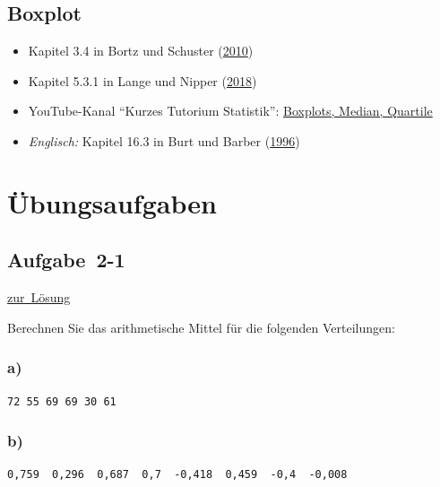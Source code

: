\documentclass[
  11pt,
  ngerman,
  a4paper,
]{report}
\providecommand{\tightlist}{%
  \setlength{\itemsep}{0pt}\setlength{\parskip}{0pt}}
\begin{document}
\hypertarget{boxplot-1}{%
\subsection{Boxplot}\label{boxplot-1}}

\begin{itemize}
\tightlist
\item
  Kapitel 3.4 in Bortz und Schuster (\protect\hyperlink{ref-bortz}{2010})
\item
  Kapitel 5.3.1 in Lange und Nipper (\protect\hyperlink{ref-delange}{2018})
\item
  YouTube-Kanal \enquote{Kurzes Tutorium Statistik}: \href{https://www.youtube.com/watch?v=HsDeAoBOyS4}{Boxplots, Median, Quartile}
\item
  \emph{Englisch:} Kapitel 16.3 in Burt und Barber (\protect\hyperlink{ref-burt}{1996})
\end{itemize}

\hypertarget{uxfcbungsaufgaben-1}{%
\section*{Übungsaufgaben}\label{uxfcbungsaufgaben-1}}

\hypertarget{aufgabe-2-1}{%
\subsection{Aufgabe~2-1}\label{aufgabe-2-1}}

\protect\hyperlink{loesung-2-1}{zur~Lösung}

Berechnen Sie das arithmetische Mittel für die folgenden Verteilungen:

\hypertarget{a}{%
\subsubsection{a)}\label{a}}

\begin{verbatim}
72 55 69 69 30 61
\end{verbatim}

\hypertarget{b}{%
\subsubsection{b)}\label{b}}

\begin{verbatim}
0,759  0,296  0,687  0,7  -0,418  0,459  -0,4  -0,008
\end{verbatim}
\end{document}
